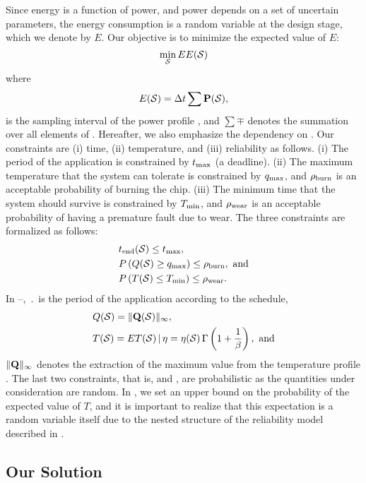 Since energy is a function of power, and power depends on a set of uncertain
parameters, the energy consumption is a random variable at the design stage,
which we denote by $E$. Our objective is to minimize the expected value of $E$:
\[
  \min_{\schedule} \expectation{E(\schedule)}
\]
where
\[
  E(\schedule) = \dt \sum \mp(\schedule),
\]
\dt is the sampling interval of the power profile \mp, and $\sum \mp$ denotes
the summation over all elements of \mp. Hereafter, we also emphasize the
dependency on \schedule. Our constraints are (i) time, (ii) temperature, and
(iii) reliability as follows. (i) The period of the application is constrained
by $t_\maximum$ (a deadline). (ii) The maximum temperature that the system can
tolerate is constrained by $\q_\maximum$, and $\rho_\burn$ is an acceptable
probability of burning the chip. (iii) The minimum time that the system should
survive is constrained by $T_\minimum$, and $\rho_\wear$ is an acceptable
probability of having a premature fault due to wear. The three constraints are
formalized as follows:
\begin{align}
  & \period(\schedule) \leq t_\maximum, \elab{timing-constraint} \\
  & \probability\left(Q(\schedule) \geq \q_\maximum\right) \leq \rho_\burn, \text{ and} \elab{thermal-constraint} \\
  & \probability\left(T(\schedule) \leq T_\minimum\right) \leq \rho_\wear. \elab{reliability-constraint}
\end{align}
In --, $\period$ is the
period of the application according to the schedule,
\begin{align*}
  & Q(\schedule) = \norm[\infty]{\mq(\schedule)}, \\
  & T(\schedule) = \expectation{T(\schedule) \, | \, \eta} = \eta(\schedule) \, \Gamma\left(1 + \frac{1}{\beta}\right), \text{ and}
\end{align*}
$\norm[\infty]{\mq}$ denotes the extraction of the maximum value from the
temperature profile \mq. The last two constraints, that is,
 and , are probabilistic
as the quantities under consideration are random. In
, we set an upper bound on the probability of the
expected value of $T$, and it is important to realize that this expectation is a
random variable itself due to the nested structure of the reliability model
described in .

\subsection{Our Solution}

